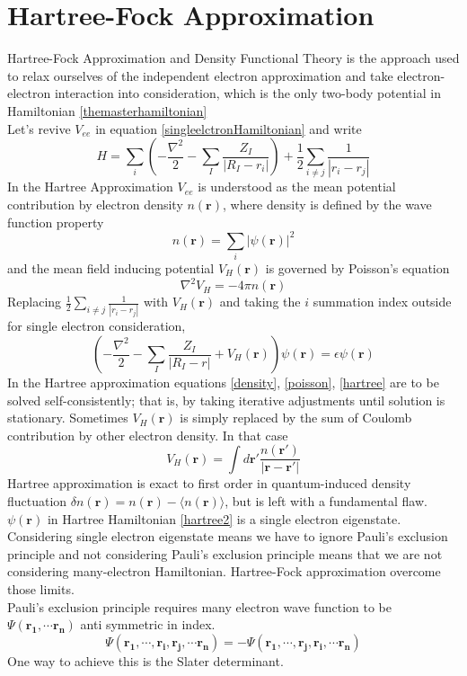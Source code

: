 \documentclass{article}
\begin{document}
\section*{Hartree-Fock Approximation}
Hartree-Fock Approximation and Density Functional Theory is the approach used to relax ourselves of the independent electron approximation and take electron-electron interaction into consideration, which is the only two-body potential in Hamiltonian \eqref{themasterhamiltonian}\\
Let's revive $V_{ee}$ in equation \eqref{singleelctronHamiltonian} and write
\begin{equation}
	H=\sum_{i}\left(-\frac{\nabla^{2}}{2}-\sum_{I}\frac{Z_{I}}{|R_{I}-r_{i}|}\right)+\frac{1}{2}\sum_{i\neq j}\frac{1}{|r_{i}-r_{j}|}
\end{equation}
In the Hartree Approximation $V_{ee}$ is understood as the mean potential contribution by electron density $n(\mathbf{r})$, where density is defined by the wave function property
\begin{equation}
	n(\mathbf{r})=\sum_{i}|\psi(\mathbf{r})|^{2}\label{density}
\end{equation}
and the mean field inducing potential $V_{H}(\mathbf{r})$ is governed by Poisson's equation
\begin{equation}
	\nabla^{2}V_{H}=-4\pi n(\mathbf{r})\label{poisson}
\end{equation}
Replacing $\frac{1}{2}\sum_{i\neq j}\frac{1}{|r_{i}-r_{j}|}$ with $V_{H}(\mathbf{r})$ and taking the $i$ summation index outside for single electron consideration,
\begin{equation}
	\left(-\frac{\nabla^{2}}{2}-\sum_{I}\frac{Z_{I}}{|R_{I}-r|}+V_{H}(\mathbf{r})\right)\psi(\mathbf{r})=\epsilon\psi(\mathbf{r})\label{hartree}
\end{equation}
In the Hartree approximation equations \eqref{density}, \eqref{poisson}, \eqref{hartree} are to be solved self-consistently; that is, by taking iterative adjustments until solution is stationary. Sometimes $V_{H}(\mathbf{r})$ is simply replaced by the sum of Coulomb contribution by other electron density. In that case
\begin{equation}
	V_{H}(\mathbf{r})=\int d\mathbf{r}'\frac{n(\mathbf{r}')}{|\mathbf{r}-\mathbf{r}'|}\label{hartree2}
\end{equation}
Hartree approximation is exact to first order in quantum-induced density fluctuation $\delta n(\mathbf{r})=n(\mathbf{r})-\langle n(\mathbf{r})\rangle$, but is left with a fundamental flaw. $\psi(\mathbf{r})$ in Hartree Hamiltonian \eqref{hartree2} is a single electron eigenstate. Considering single electron eigenstate means we have to ignore Pauli's exclusion principle and not considering Pauli's exclusion principle means that we are not considering many-electron Hamiltonian. Hartree-Fock approximation overcome those limits.\\
Pauli's exclusion principle requires many electron wave function to be $\Psi(\mathbf{r_{1}},\cdots\mathbf{r_{n}})$ anti symmetric in index.
$$\Psi(\mathbf{r_{1}},\cdots,\mathbf{r_i},\mathbf{r_j},\cdots\mathbf{r_{n}})=-\Psi(\mathbf{r_{1}},\cdots,\mathbf{r_j},\mathbf{r_i},\cdots\mathbf{r_{n}})$$
One way to achieve this is the Slater determinant.
\end{document}
